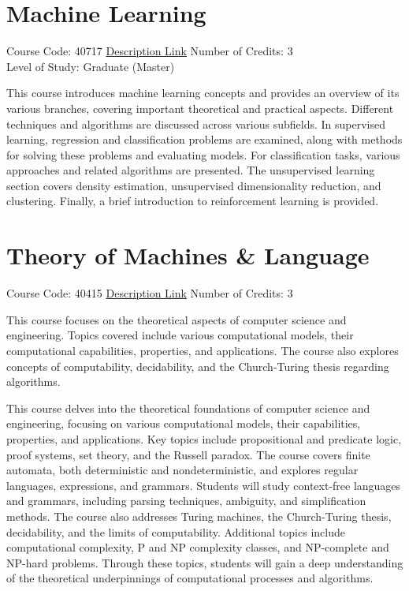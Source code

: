 \section{Machine Learning}
Course Code: 40717 \qquad \quad \href{https://docs.ce.sharif.edu/course/40717}{Description Link}
\qquad \quad Number of Credits: 3
\\Level of Study: Graduate (Master)

This course introduces machine learning concepts and provides an overview of its various branches, covering important theoretical and practical aspects. Different techniques and algorithms are discussed across various subfields. In supervised learning, regression and classification problems are examined, along with methods for solving these problems and evaluating models. For classification tasks, various approaches and related algorithms are presented. The unsupervised learning section covers density estimation, unsupervised dimensionality reduction, and clustering. Finally, a brief introduction to reinforcement learning is provided.

\section{Theory of Machines \& Language}
Course Code: 40415 \qquad \quad \href{https://docs.ce.sharif.edu/course/40415}{Description Link}
\qquad \quad Number of Credits: 3

This course focuses on the theoretical aspects of computer science and engineering. Topics covered include various computational models, their computational capabilities, properties, and applications. The course also explores concepts of computability, decidability, and the Church-Turing thesis regarding algorithms.


This course delves into the theoretical foundations of computer science and engineering, focusing on various computational models, their capabilities, properties, and applications. Key topics include propositional and predicate logic, proof systems, set theory, and the Russell paradox. The course covers finite automata, both deterministic and nondeterministic, and explores regular languages, expressions, and grammars. Students will study context-free languages and grammars, including parsing techniques, ambiguity, and simplification methods. The course also addresses Turing machines, the Church-Turing thesis, decidability, and the limits of computability. Additional topics include computational complexity, P and NP complexity classes, and NP-complete and NP-hard problems. Through these topics, students will gain a deep understanding of the theoretical underpinnings of computational processes and algorithms.

